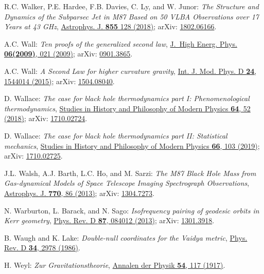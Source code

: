 \begin{thebibliography}{123}
R.C. Walker, P.E. Hardee, F.B. Davies, C. Ly, and W. Junor:
{\em The Structure and Dynamics of the Subparsec Jet in M87 Based on 50 VLBA Observations over 17 Years at 43 GHz},
\href{https://doi.org/10.3847/1538-4357/aaafcc}{Astrophys. J. {\bf 855} 128 (2018)};
arXiv: \href{https://arxiv.org/abs/1802.06166}{1802.06166}.

A.C. Wall:
{\em Ten proofs of the generalized second law},
\href{https://doi.org/10.1088/1126-6708/2009/06/021}{J.~High Energ. Phys. {\bf 06(2009)}, 021 (2009)};
arXiv: \href{https://arxiv.org/abs/0901.3865}{0901.3865}.

A.C. Wall:
{\em A Second Law for higher curvature gravity},
\href{https://doi.org/10.1142/S0218271815440149}{Int. J. Mod. Phys. D {\bf 24}, 1544014 (2015)};
arXiv: \href{https://arxiv.org/abs/1504.08040}{1504.08040}.

D. Wallace:
{\em The case for black hole thermodynamics part I: Phenomenological thermodynamics},
\href{https://doi.org/10.1016/j.shpsb.2018.05.002}{Studies in History and Philosophy of Modern Physics {\bf 64}, 52 (2018)};
arXiv: \href{https://arxiv.org/abs/1710.02724}{1710.02724}.

D. Wallace:
{\em The case for black hole thermodynamics part II: Statistical mechanics},
\href{https://doi.org/10.1016/j.shpsb.2018.10.006}{Studies in History and Philosophy of Modern Physics {\bf 66}, 103 (2019)};
arXiv: \href{https://arxiv.org/abs/1710.02725}{1710.02725}.

J.L. Walsh, A.J. Barth, L.C. Ho, and M. Sarzi:
{\em The M87 Black Hole Mass from Gas-dynamical Models of Space Telescope Imaging Spectrograph Observations},
\href{https://doi.org/10.1088/0004-637X/770/2/86}{Astrophys. J. {\bf 770}, 86 (2013)};
arXiv: \href{https://arxiv.org/abs/1304.7273}{1304.7273}.

N. Warburton, L. Barack, and N. Sago:
{\em Isofrequency pairing of geodesic orbits in Kerr geometry},
\href{https://doi.org/10.1103/PhysRevD.87.084012}{Phys. Rev. D {\bf 87}, 084012 (2013)};
arXiv: \href{https://arxiv.org/abs/1301.3918}{1301.3918}.

B. Waugh and K. Lake:
{\em Double-null coordinates for the Vaidya metric},
\href{https://doi.org/10.1103/PhysRevD.34.2978}{Phys. Rev. D {\bf 34}, 2978 (1986)}.

H. Weyl:
{\em Zur Gravitationstheorie},
\href{https://doi.org/10.1002/andp.19173591804}{Annalen der Physik {\bf 54}, 117 (1917)}.


\end{thebibliography}
